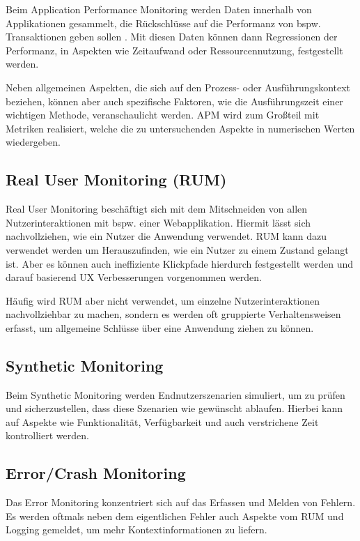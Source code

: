 Beim Application Performance Monitoring werden Daten innerhalb von Applikationen gesammelt, die Rückschlüsse auf die Performanz von bspw. Transaktionen geben sollen \cite{StudyingTheEffectivenessOfAPMTools}. Mit diesen Daten können dann Regressionen der Performanz, in Aspekten wie Zeitaufwand oder Ressourcennutzung, festgestellt werden.

Neben allgemeinen Aspekten, die sich auf den Prozess- oder Ausführungskontext beziehen, können aber auch spezifische Faktoren, wie die Ausführungszeit einer wichtigen Methode, veranschaulicht werden. APM wird zum Großteil mit Metriken realisiert, welche die zu untersuchenden Aspekte in numerischen Werten wiedergeben.

\subsection{Real User Monitoring (RUM)}

Real User Monitoring beschäftigt sich mit dem Mitschneiden von allen Nutzerinteraktionen mit bspw. einer Webapplikation. Hiermit lässt sich nachvollziehen, wie ein Nutzer die Anwendung verwendet. RUM kann dazu verwendet werden um Herauszufinden, wie ein Nutzer zu einem Zustand gelangt ist. Aber es können auch ineffiziente Klickpfade hierdurch festgestellt werden und darauf basierend UX Verbesserungen vorgenommen werden.

Häufig wird RUM aber nicht verwendet, um einzelne Nutzerinteraktionen nachvollziehbar zu machen, sondern es werden oft gruppierte Verhaltensweisen erfasst, um allgemeine Schlüsse über eine Anwendung ziehen zu können.

\subsection{Synthetic Monitoring}

Beim Synthetic Monitoring werden Endnutzerszenarien simuliert, um zu prüfen und sicherzustellen, dass diese Szenarien wie gewünscht ablaufen. Hierbei kann auf Aspekte wie Funktionalität, Verfügbarkeit und auch verstrichene Zeit kontrolliert werden.

\subsection{Error/Crash Monitoring}

Das Error Monitoring konzentriert sich auf das Erfassen und Melden von Fehlern. Es werden oftmals neben dem eigentlichen Fehler auch Aspekte vom RUM und Logging gemeldet, um mehr Kontextinformationen zu liefern.

